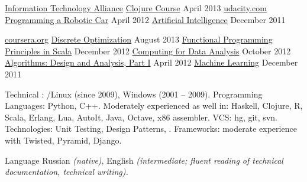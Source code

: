 \documentclass[unicode, 10pt, a4paper, oneside, fleqn]{article}
\begin{document}
\vspace{-0.7em}
\begin{minipage}[t]{0.40\textwidth}
\setlength\abovedisplayskip{0pt}
\job
    {\href{http://ita.by}{Information Technology Alliance}}
    {}
    {
        \position
            {\href{https://docs.google.com/file/d/0B2cptPgckn74RlpNa0xVNG9VSnM/edit}
                  {Clojure Course}}
            {April 2013}
            {}
    }
\job
    {\href{http://udacity.com}{udacity.com}}
    {}
    {
        \position
            {\href{https://docs.google.com/document/d/1LpUyUwh_gGyPyKf-oxTDOy8ncQejwog1jhgMmtf59mY/edit}
                  {Programming a Robotic Car}}
            {April 2012}
            {}
        \position
            {\href{https://docs.google.com/document/d/1wD_QEJ7mdzxbR_PMVEbZ_tZ0SyakJ_8Y1gBAj_S5Ufg/edit}
                  {Artificial Intelligence}}
            {December 2011}
            {}
    }
\end{minipage}
\hfill
\begin{minipage}[t]{0.58\textwidth}
\setlength\abovedisplayskip{0pt}
\job
    {\href{http://www.coursera.org}{coursera.org}}
    {}
    {
        \position
            {\href{https://docs.google.com/file/d/0B2cptPgckn74ZnN0Znhnd3ZUejg/edit?usp=sharing}
                  {Discrete Optimization}}
            {August 2013}
            {}
        \position
            {\href{https://docs.google.com/document/d/1AWaukQ0K4C-ZcuRRqYANJuYDOPxYH7MoVdXYKHPYJ8I/edit}
                  {Functional Programming Principles in Scala}}
            {December 2012}
            {}
        \position
            {\href{https://docs.google.com/document/d/1Rh_5PSFQBBtEwMZIa5r69H5ONOjpX5jfiPorFIvQg5Y/edit}
                  {Computing for Data Analysis}}
            {October 2012}
            {}
        \position
            {\href{https://docs.google.com/document/d/1j6LlyJUGM03TxqSImyHeHoa16dSCLZQop6zmrPe8YOw/edit}
                  {Algorithms: Design and Analysis, Part I}}
            {April 2012}
            {}
        \position
            {\href{https://docs.google.com/document/d/11OT8thqIgBiwM80D_HjpiGtKTz5CnxiITPG_H6QbuUA/edit}
                  {Machine Learning}}
            {December 2011}
            {}
    }
\end{minipage}



\inlineheadsection  %
    {Technical}
    {
        : /Linux (since 2009), Windows (2001 -- 2009).
        Programming Languages: Python, C++.
        Moderately experienced as well in: Haskell, Clojure, R, Scala, Erlang,
        Lua, AutoIt, Java, Octave, x86 assembler.
        VCS: hg, git, svn.
        Technologies: Unit Testing, Design Patterns, .
        Frameworks: moderate experience with Twisted, Pyramid, Django.
    }

\inlineheadsection
    {Language}
    {
        Russian \emph{(native)}, English \emph{(intermediate; fluent reading of
        technical documentation, technical writing).}
    }

%
%
\end{document}
